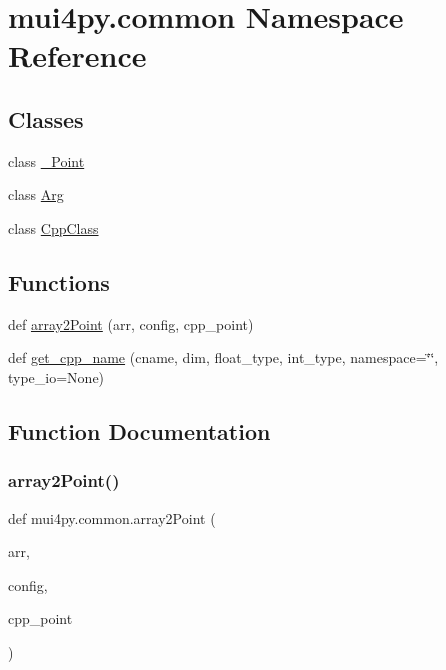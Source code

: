 \hypertarget{namespacemui4py_1_1common}{}\section{mui4py.\+common Namespace Reference}
\label{namespacemui4py_1_1common}
\subsection*{Classes}
\begin{DoxyCompactItemize}
\item 
class \hyperlink{classmui4py_1_1common_1_1___point}{\+\_\+\+Point}
\item 
class \hyperlink{classmui4py_1_1common_1_1_arg}{Arg}
\item 
class \hyperlink{classmui4py_1_1common_1_1_cpp_class}{Cpp\+Class}
\end{DoxyCompactItemize}
\subsection*{Functions}
\begin{DoxyCompactItemize}
\item 
def \hyperlink{namespacemui4py_1_1common_a1618955b98079923f5400b76fe5d308d}{array2\+Point} (arr, config, cpp\+\_\+point)
\item 
def \hyperlink{namespacemui4py_1_1common_a8f531059394175fc673a1f67fcd90cc6}{get\+\_\+cpp\+\_\+name} (cname, dim, float\+\_\+type, int\+\_\+type, namespace=\char`\"{}\char`\"{}, type\+\_\+io=None)
\end{DoxyCompactItemize}


\subsection{Function Documentation}
\mbox{\label{namespacemui4py_1_1common_a1618955b98079923f5400b76fe5d308d}} 
\subsubsection{\texorpdfstring{array2\+Point()}{array2Point()}}
{\footnotesize\ttfamily def mui4py.\+common.\+array2\+Point (\begin{DoxyParamCaption}\item[{}]{arr,  }\item[{}]{config,  }\item[{}]{cpp\+\_\+point }\end{DoxyParamCaption})}

